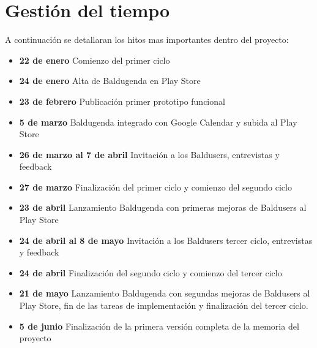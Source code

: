 \section{Gestión del tiempo}
\label{secc:Gestión del tiempo}

A continuación se detallaran los hitos mas importantes dentro del proyecto:

\begin{itemize}
	\item \textbf{22 de enero} Comienzo del primer ciclo
	\item \textbf{24 de enero} Alta de Baldugenda en Play Store
	\item \textbf{23 de febrero} Publicación primer prototipo funcional
	\item \textbf{5 de marzo} Baldugenda integrado con Google Calendar y subida al Play Store
	\item \textbf{26 de marzo al 7 de abril} Invitación a los Baldusers, entrevistas y feedback
	\item \textbf{27 de marzo} Finalización del primer ciclo y comienzo del segundo ciclo
	\item \textbf{23 de abril} Lanzamiento Baldugenda con primeras mejoras de Baldusers al Play Store
	\item \textbf{24 de abril al 8 de mayo} Invitación a los Baldusers tercer ciclo, entrevistas y feedback
	\item \textbf{24 de abril} Finalización del segundo ciclo y comienzo del tercer ciclo
	\item \textbf{21 de mayo} Lanzamiento Baldugenda con segundas mejoras de Baldusers al Play Store, fin de las tareas de implementación y finalización del tercer ciclo.
	\item \textbf{5 de junio} Finalización de la primera versión completa de la memoria del proyecto
\end{itemize}